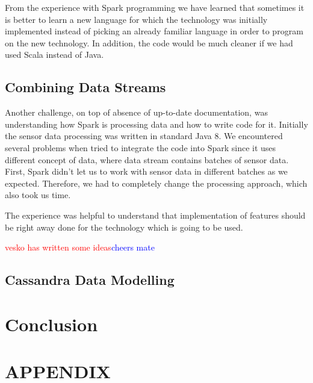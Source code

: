 \documentclass[prodmode,acmtosem]{acmsmall} %
\begin{document}
From the experience with Spark programming we have learned that sometimes it is better to learn a new language for which the technology was initially implemented instead of picking an already familiar language in order to program on the new technology. In addition, the code would be much cleaner if we had used Scala instead of Java.

\subsection{Combining Data Streams}
Another challenge, on top of absence of up-to-date documentation, was understanding how Spark is processing data and how to write code for it. Initially the sensor data processing was written in standard Java 8. We encountered several problems when tried to integrate the code into Spark since it uses different concept of data, where data stream contains batches of sensor data. First, Spark didn't let us to work with sensor data in different batches as we expected. Therefore, we had to completely change the processing approach, which also took us time.

The experience was helpful to understand that implementation of features should be right away done for the technology which is going to be used.

\textcolor{red}{vesko has written some ideas}\textcolor{blue}{cheers mate}

\subsection{Cassandra Data Modelling}

\section{Conclusion}


\appendix
\section*{APPENDIX} \label{Appendix}
\setcounter{section}{1}


\begin{acks}
\end{acks}  
\end{document}
